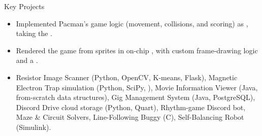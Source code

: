 \documentclass{cv}
\begin{document}
\begin{experienceSection}{Key Projects}
    \lrTitle[
        ltitle={FPGA Pacman},
        rtitle={(Verilog, Vivado, Nexys 4 FPGA)}
    ]
    \begin{itemize}
        \item Implemented Pacman's game logic (movement, collisions, and scoring) as , taking the .
        \item Rendered the game from sprites in on-chip , with custom frame-drawing logic and a .
    \end{itemize}

    \lrTitle[
        ltitle={Other Projects},
        rtitle={},
    ]
    \begin{itemize}
        \item Resistor Image Scanner (Python, OpenCV, K-means, Flask), Magnetic Electron Trap simulation (Python, SciPy, ), Movie Information Viewer (Java, from-scratch data structures), Gig Management System (Java, PostgreSQL), Discord Drive cloud storage (Python, Quart), Rhythm-game Discord bot, Maze \& Circuit Solvers, Line-Following Buggy (C), Self-Balancing Robot (Simulink).
    \end{itemize}
\end{experienceSection}
\end{document}
